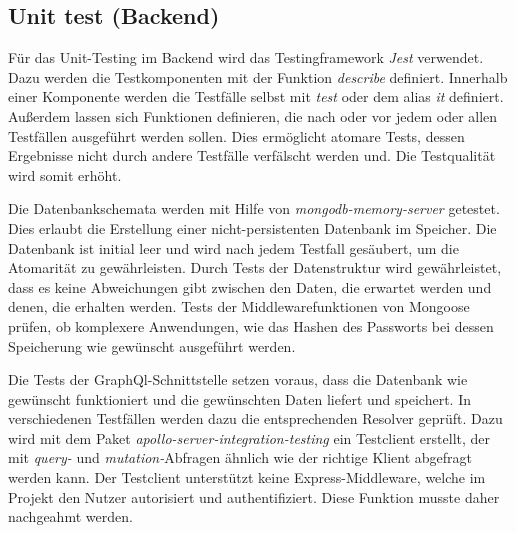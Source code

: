 
\subsection{Unit test (Backend)}
Für das Unit-Testing im Backend wird das Testingframework \textit{Jest} verwendet.
Dazu werden die Testkomponenten mit der Funktion \textit{describe} definiert.
Innerhalb einer Komponente werden die Testfälle selbst mit \textit{test} oder dem alias \textit{it} definiert.
Außerdem lassen sich Funktionen definieren, die nach oder vor jedem oder allen Testfällen ausgeführt werden sollen.
Dies ermöglicht atomare Tests, dessen Ergebnisse nicht durch andere Testfälle verfälscht werden und.
Die Testqualität wird somit erhöht.

Die Datenbankschemata werden mit Hilfe von \textit{mongodb-memory-server} getestet.
Dies erlaubt die Erstellung einer nicht-persistenten Datenbank im Speicher.
Die Datenbank ist initial leer und wird nach jedem Testfall gesäubert, um die Atomarität zu gewährleisten.
Durch Tests der Datenstruktur wird gewährleistet, dass es keine Abweichungen gibt zwischen den Daten, die erwartet werden und denen, die erhalten werden.
Tests der Middlewarefunktionen von Mongoose prüfen, ob komplexere Anwendungen, wie das Hashen des Passworts bei dessen Speicherung wie gewünscht ausgeführt werden.

Die Tests der GraphQl-Schnittstelle setzen voraus, dass die Datenbank wie gewünscht funktioniert und die gewünschten Daten liefert und speichert.
In verschiedenen Testfällen werden dazu die entsprechenden Resolver geprüft.
Dazu wird mit dem Paket \textit{apollo-server-integration-testing} ein Testclient erstellt, der mit \textit{query-} und \textit{mutation-}Abfragen ähnlich wie der richtige Klient abgefragt werden kann.
Der Testclient unterstützt keine Express-Middleware, welche im Projekt den Nutzer autorisiert und authentifiziert.
Diese Funktion musste daher nachgeahmt werden. 


